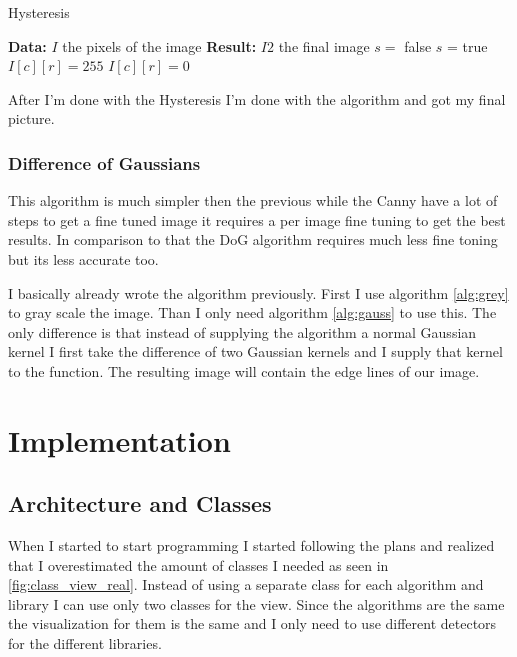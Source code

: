 \begin{algorithm}[H]
\caption{Hysteresis}
\label{alg:hys}
\begin{algorithmic}
\State \textbf{Data:} $I$ the pixels of the image
\State \textbf{Result:} $I2$ the final image
\State $s =$ false
\State $s$ = true
\EndIf
\EndFor
\EndFor
{}
\State $I[c][r] = 255$
\Else
\State $I[c][r] = 0$
\EndIf
\EndFor
\end{algorithmic}
\end{algorithm}

After I'm done with the Hysteresis I'm done with the algorithm and got my final picture.

\subsubsection{Difference of Gaussians}

This algorithm is much simpler then the previous while the \ac{Canny} have a lot of steps to get a fine tuned image it requires a per image fine tuning to get the best results. In comparison to that the \ac{DoG} algorithm requires much less fine toning but its less accurate too.

I basically already wrote the algorithm previously. First I use algorithm \ref{alg:grey} to gray scale the image. Than I only need algorithm \ref{alg:gauss} to use this. The only difference is that instead of supplying the algorithm a normal Gaussian kernel I first take the difference of two Gaussian kernels and I supply that kernel to the function\cite{dog}. The resulting image will contain the edge lines of our image.

\section{Implementation}

\subsection{Architecture and Classes}
\label{chap:Imp_Arc}
When I started to start programming I started following the plans and realized that I overestimated the amount of classes I needed as seen in \autoref{fig:class_view_real}. Instead of using a separate class for each algorithm and library I can use only two classes for the view. Since the algorithms are the same the visualization for them is the same and I only need to use different detectors for the different libraries.

